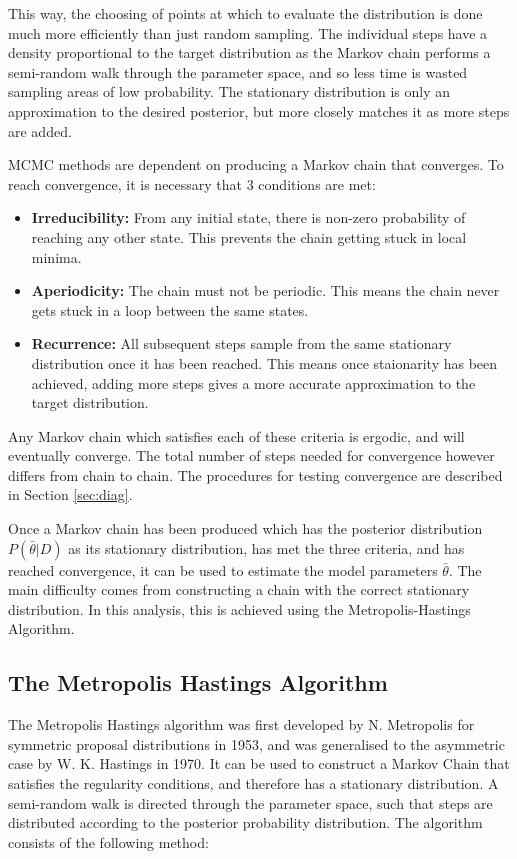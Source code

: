 This way, the choosing of points at which to evaluate the distribution is done much more efficiently than just random sampling. The individual steps have a density proportional to the target distribution as the Markov chain performs a semi-random walk through the parameter space, and so less time is wasted sampling areas of low probability.  The stationary distribution is only an approximation to the desired posterior, but more closely matches it as more steps are added. 

MCMC methods are dependent on producing a Markov chain that converges. To reach convergence, it is necessary that 3 conditions are met:

\begin{itemize}
   \item \textbf{Irreducibility:} From any initial state, there is non-zero probability of reaching any other state. This prevents the chain getting stuck in local minima.
   \item \textbf{Aperiodicity:} The chain must not be periodic. This means the chain never gets stuck in a loop between the same states.
   \item \textbf{Recurrence:} All subsequent steps sample from the same stationary distribution once it has been reached. This means once staionarity has been achieved, adding more steps gives a more accurate approximation to the target distribution.
\end{itemize}

Any Markov chain which satisfies each of these criteria is ergodic, and will eventually converge. The total number of steps needed for convergence however differs from chain to chain. The procedures for testing convergence are described in Section \ref{sec:diag}. 

Once a Markov chain has been produced which has the posterior distribution $P(\bar{\theta}|D)$ as its stationary distribution, has met the three criteria, and has reached convergence, it can be used to estimate the model parameters $\bar{\theta}$. The main difficulty comes from constructing a chain with the correct stationary distribution. In this analysis, this is achieved using the Metropolis-Hastings Algorithm.

\subsection{The Metropolis Hastings Algorithm}\label{sec:methast}

The Metropolis Hastings algorithm was first developed by N. Metropolis for symmetric proposal distributions in 1953\cite{met}, and was generalised to the asymmetric case by  W. K. Hastings in 1970\cite{methast}. It can be used to construct a Markov Chain that satisfies the regularity conditions, and therefore has a stationary distribution. A semi-random walk is directed through the parameter space, such that steps are distributed according to the posterior probability distribution. The algorithm consists of the following method:

